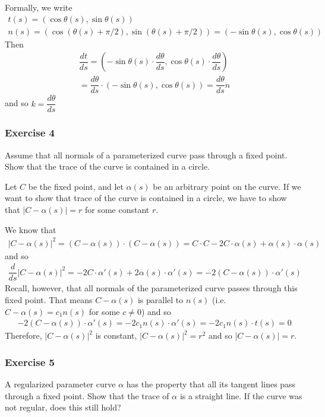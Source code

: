 \documentclass{article}
\begin{document}
	Formally, we write
	\begin{gather*}
		t(s) = \left( \cos \theta(s), \sin \theta(s) \right) \\
		n(s) = \left( \cos \left( \theta(s) + \pi/2 \right), \sin \left( \theta(s) + \pi/2 \right) \right)
		= \left( -\sin \theta(s), \cos \theta(s) \right)
	\end{gather*}
	Then 
	\begin{gather*}
		\dfrac{dt}{ds} = \left( -\sin \theta(s) \cdot \dfrac{d\theta}{ds}, \cos \theta(s) \cdot \dfrac{d\theta}{ds} \right) \\
		= \dfrac{d\theta}{ds} \cdot \left( -\sin \theta(s), \cos \theta(s) \right)
		= \dfrac{d\theta}{ds} n
	\end{gather*}
	and so $k = \dfrac{d\theta}{ds}$
	
	\subsubsection*{Exercise 4}
	Assume that all normals of a parameterized curve pass through a fixed point. Show that the trace of the curve is contained in a circle.
	
	Let $C$ be the fixed point, and let $\alpha(s)$ be an arbitrary point on the curve. If we want to show that trace of the curve is contained in a circle, we have to show that $|C - \alpha(s)| = r$ for some constant $r$.
	
	We know that
	\begin{gather*}
		|C - \alpha(s)|^2 = (C - \alpha(s)) \cdot (C - \alpha(s)) = C \cdot C - 2C \cdot \alpha(s) + \alpha(s) \cdot \alpha(s)
	\end{gather*}
	and so
	\begin{gather*}
		\dfrac{d}{ds} |C - \alpha(s)|^2 = -2C \cdot \alpha'(s) + 2\alpha(s) \cdot \alpha'(s) = -2(C - \alpha(s)) \cdot \alpha'(s)
	\end{gather*}
	Recall, however, that all normals of the parameterized curve passes through this fixed point. That means $C - \alpha(s)$ is parallel to $n(s)$ (i.e. $C - \alpha(s) = c_1 n(s)$ for some $c \neq 0$) and so
	\begin{gather*}
		-2(C - \alpha(s)) \cdot \alpha'(s) = -2c_1 n(s) \cdot \alpha'(s) = -2c_1 n(s) \cdot t(s) = 0
	\end{gather*}
	Therefore, $|C - \alpha(s)|^2$ is constant, $|C - \alpha(s)|^2 = r^2$ and so $|C - \alpha(s)| = r$.
	
	\subsubsection*{Exercise 5}
	A regularized parameter curve $\alpha$ has the property that all its tangent lines pass through a fixed point. Show that the trace of $\alpha$ is a straight line. If the curve was not regular, does this still hold?
	
\end{document}
